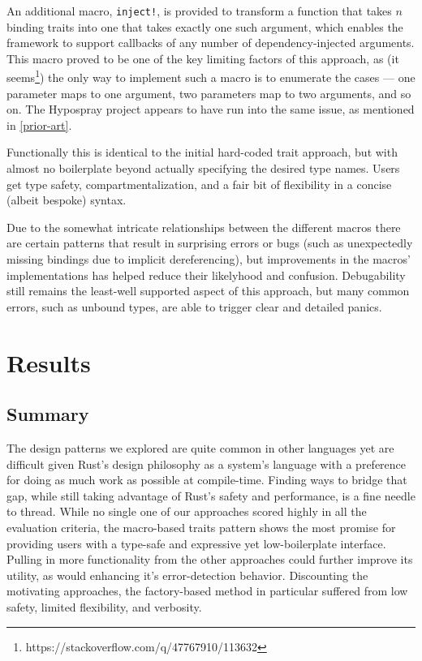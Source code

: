 \documentclass[sigconf]{acmart}
\def\code#1{\lstinline{#1}}
\begin{document}
An additional macro, \code{inject!}, is provided to transform a function that takes $n$ binding traits into one that takes exactly one such argument, which enables the framework to support callbacks of any number of dependency-injected arguments. This macro proved to be one of the key limiting factors of this approach, as (it seems\footnote{https://stackoverflow.com/q/47767910/113632}) the only way to implement such a macro is to enumerate the cases --- one parameter maps to one argument, two parameters map to two arguments, and so on. The Hypospray project appears to have run into the same issue, as mentioned in \ref{prior-art}.

Functionally this is identical to the initial hard-coded trait approach, but with almost no boilerplate beyond actually specifying the desired type names. Users get type safety, compartmentalization, and a fair bit of flexibility in a concise (albeit bespoke) syntax.

Due to the somewhat intricate relationships between the different macros there are certain patterns that result in surprising errors or bugs (such as unexpectedly missing bindings due to implicit dereferencing), but improvements in the macros' implementations has helped reduce their likelyhood and confusion. Debugability still remains the least-well supported aspect of this approach, but many common errors, such as unbound types, are able to trigger clear and detailed panics.

\section{Results}

\subsection{Summary}

 The design patterns we explored are quite common in other languages yet are difficult given Rust's design philosophy as a system's language with a preference for doing as much work as possible at compile-time. Finding ways to bridge that gap, while still taking advantage of Rust's safety and performance, is a fine needle to thread. While no single one of our approaches scored highly in all the evaluation criteria, the macro-based traits pattern shows the most promise for providing users with a type-safe and expressive yet low-boilerplate interface. Pulling in more functionality from the other approaches could further improve its utility, as would enhancing it's error-detection behavior. Discounting the motivating approaches, the factory-based method in particular suffered from low safety, limited flexibility, and verbosity.
\end{document}
